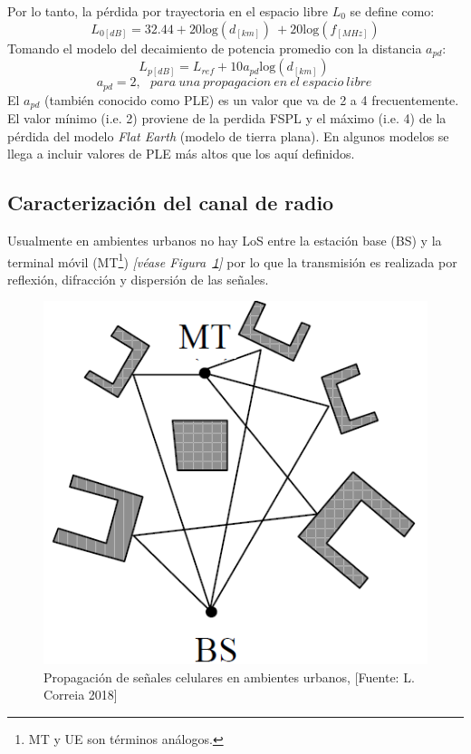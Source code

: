 Por lo tanto, la pérdida por trayectoria en el espacio libre $L_0$ se define como:
\begin{equation}
L_{0[dB]}=32.44+20{\mathrm{log} \left(d_{\left[km\right]}\right)\ }+20\mathrm{log}\mathrm{}(f_{[MHz]})
\label{eqn:L0}
\end{equation}
Tomando el modelo del decaimiento de potencia promedio con la distancia $a_{pd}$:
\begin{equation}
L_{p[dB]}=L_{ref}+10a_{pd}{\mathrm{log} \left(d_{\left[km\right]}\right)\ }
\label{eqn:Lp_ref}
\end{equation}
\[a_{pd}=2,\ \ \ para\ una\ propagacion\ en\ el\ espacio\ libre\ \] 
El $a_{pd}$ (también conocido como PLE) es un valor que va de 2 a 4 frecuentemente. El valor mínimo (i.e. 2) proviene de la perdida FSPL y el máximo (i.e. 4) de la pérdida del modelo \textit{Flat Earth} (modelo de tierra plana). En algunos modelos se llega a incluir valores de PLE más altos que los aquí definidos.

\subsection{Caracterización del canal de radio}

Usualmente en ambientes urbanos no hay LoS entre la estación base (BS) y la terminal móvil (MT\footnote{MT y UE son términos análogos.}) \textit{[véase Figura~\ref{fig:Propagacion}]} por lo que la transmisión es realizada por reflexión, difracción y dispersión de las señales.\newline

\begin{figure}[th]
\centering
\includegraphics[scale=.5]{Figures/Propagación de señales celulares en ambientes urbanos.}
\decoRule
\caption[Propagación de señales celulares en ambientes urbanos]{Propagación de señales celulares en ambientes urbanos, [Fuente: L. Correia 2018]}
\label{fig:Propagacion}
\end{figure}


